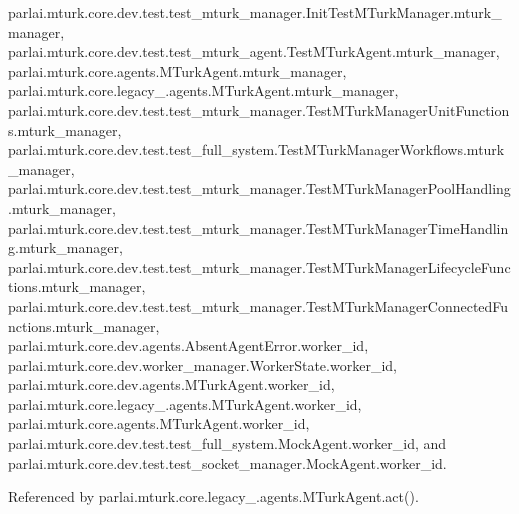 parlai.\+mturk.\+core.\+dev.\+test.\+test\+\_\+mturk\+\_\+manager.\+Init\+Test\+M\+Turk\+Manager.\+mturk\+\_\+manager, parlai.\+mturk.\+core.\+dev.\+test.\+test\+\_\+mturk\+\_\+agent.\+Test\+M\+Turk\+Agent.\+mturk\+\_\+manager, parlai.\+mturk.\+core.\+agents.\+M\+Turk\+Agent.\+mturk\+\_\+manager, parlai.\+mturk.\+core.\+legacy\+\_.\+agents.\+M\+Turk\+Agent.\+mturk\+\_\+manager, parlai.\+mturk.\+core.\+dev.\+test.\+test\+\_\+mturk\+\_\+manager.\+Test\+M\+Turk\+Manager\+Unit\+Functions.\+mturk\+\_\+manager, parlai.\+mturk.\+core.\+dev.\+test.\+test\+\_\+full\+\_\+system.\+Test\+M\+Turk\+Manager\+Workflows.\+mturk\+\_\+manager, parlai.\+mturk.\+core.\+dev.\+test.\+test\+\_\+mturk\+\_\+manager.\+Test\+M\+Turk\+Manager\+Pool\+Handling.\+mturk\+\_\+manager, parlai.\+mturk.\+core.\+dev.\+test.\+test\+\_\+mturk\+\_\+manager.\+Test\+M\+Turk\+Manager\+Time\+Handling.\+mturk\+\_\+manager, parlai.\+mturk.\+core.\+dev.\+test.\+test\+\_\+mturk\+\_\+manager.\+Test\+M\+Turk\+Manager\+Lifecycle\+Functions.\+mturk\+\_\+manager, parlai.\+mturk.\+core.\+dev.\+test.\+test\+\_\+mturk\+\_\+manager.\+Test\+M\+Turk\+Manager\+Connected\+Functions.\+mturk\+\_\+manager, parlai.\+mturk.\+core.\+dev.\+agents.\+Absent\+Agent\+Error.\+worker\+\_\+id, parlai.\+mturk.\+core.\+dev.\+worker\+\_\+manager.\+Worker\+State.\+worker\+\_\+id, parlai.\+mturk.\+core.\+dev.\+agents.\+M\+Turk\+Agent.\+worker\+\_\+id, parlai.\+mturk.\+core.\+legacy\+\_.\+agents.\+M\+Turk\+Agent.\+worker\+\_\+id, parlai.\+mturk.\+core.\+agents.\+M\+Turk\+Agent.\+worker\+\_\+id, parlai.\+mturk.\+core.\+dev.\+test.\+test\+\_\+full\+\_\+system.\+Mock\+Agent.\+worker\+\_\+id, and parlai.\+mturk.\+core.\+dev.\+test.\+test\+\_\+socket\+\_\+manager.\+Mock\+Agent.\+worker\+\_\+id.



Referenced by parlai.\+mturk.\+core.\+legacy\+\_.\+agents.\+M\+Turk\+Agent.\+act().

